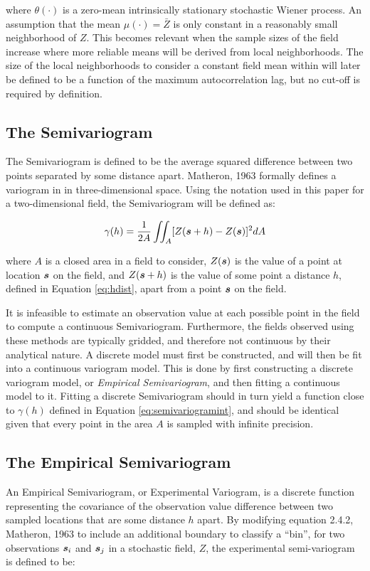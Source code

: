 \noindent where $\theta(\cdot)$ is a zero-mean intrinsically stationary stochastic Wiener process. An assumption that the mean $\mu(\cdot) = \bar{Z}$ is only constant in a reasonably small neighborhood of $Z$. This becomes relevant when the sample sizes of the field increase where more reliable means will be derived from local neighborhoods. The size of the local neighborhoods to consider a constant field mean within will later be defined to be a function of the maximum autocorrelation lag, but no cut-off is required by definition.

\subsection{The Semivariogram}
The Semivariogram is defined to be the average squared difference between two points separated by some distance apart. Matheron, 1963 formally defines a variogram in \cite{matheron:geostat} in three-dimensional space. Using the notation used in this paper for a two-dimensional field, the Semivariogram will be defined as:

\begin{equation}
    \gamma(h) = \frac{1}{2A} \iint_A [ Z({\it{\boldsymbol{s}}} + h) - Z({\it{\boldsymbol{s}}}) ]^2 dA
    \label{eq:semivariogramint}
\end{equation}

\noindent where $A$ is a closed area in a field to consider, $Z({\it{\boldsymbol{s}}})$ is the value of a point at location ${\it{\boldsymbol{s}}}$ on the field, and $Z({\it{\boldsymbol{s}}} + h)$ is the value of some point a distance $h$, defined in Equation \ref{eq:hdist}, apart from a point ${\it{\boldsymbol{s}}}$ on the field.

It is infeasible to estimate an observation value at each possible point in the field to compute a continuous Semivariogram. Furthermore, the fields observed using these methods are typically gridded, and therefore not continuous by their analytical nature. A discrete model must first be constructed, and will then be fit into a continuous variogram model. This is done by first constructing a discrete variogram model, or \textit{Empirical Semivariogram}, and then fitting a continuous model to it. Fitting a discrete Semivariogram should in turn yield a function close to $\gamma(h)$ defined in Equation \ref{eq:semivariogramint}, and should be identical given that every point in the area $A$ is sampled with infinite precision.

\subsection{The Empirical Semivariogram}
An Empirical Semivariogram, or Experimental Variogram, is a discrete function representing the covariance of the observation value difference between two sampled locations that are some distance $h$ apart. By modifying equation 2.4.2, Matheron, 1963 \cite{matheron:geostat} to include an additional boundary to classify a ``bin'', for two observations ${\it{\boldsymbol{s}}}_{i}$ and ${\it{\boldsymbol{s}}}_{j}$ in a stochastic field, $Z$, the experimental semi-variogram is defined to be:

